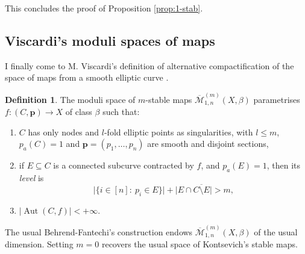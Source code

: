 \documentclass[11pt]{amsart}
\newcommand{\oM}{\overline{\mathcal{M}}}
\renewcommand{\to}{\rightarrow}
\newcommand{\Aut}{\operatorname{Aut}}
\theoremstyle{definition}
\theoremstyle{definition}
\newtheorem{dfn}[thm]{Definition}
\begin{document}
This concludes the proof of Proposition \ref{prop:1-stab}.

\subsection{Viscardi's moduli spaces of maps} I finally come to M. Viscardi's definition of alternative compactification of the space of maps from a smooth elliptic curve \cite[Definition 2.15]{VISC}.

\begin{dfn}
 The moduli space of $m$-stable maps $\oM^{(m)}_{1,n}(X,\beta)$ parametrises $f\colon (C,\mathbf p)\to X$ of class $\beta$ such that:\begin{enumerate}
                                                                                                                                      \item $C$ has only nodes and $l$-fold elliptic points as singularities, with $l\leq m$, $p_a(C)=1$ and $\mathbf{p}=(p_1,\ldots,p_n)$ are smooth and disjoint sections,
                                                                                                                                      \item if $E\subseteq C$ is a connected subcurve contracted by $f$, and $p_a(E)=1$, then its \emph{level} is \[\lvert \{i\in[n]:\ p_i\in E\}\rvert+\lvert E\cap \overline{C\setminus E}\rvert >m,\]
                                                                                                                                      \item $\lvert\Aut(C,f)\rvert<+\infty$.
                                                                                                                                     \end{enumerate}

\end{dfn}
The usual Behrend-Fantechi's construction \cite[Proposition 6.2]{BF} endows $\oM^{(m)}_{1,n}(X,\beta)$ of the usual dimension. Setting $m=0$ recovers the usual space of Kontsevich's stable maps.
\end{document}
